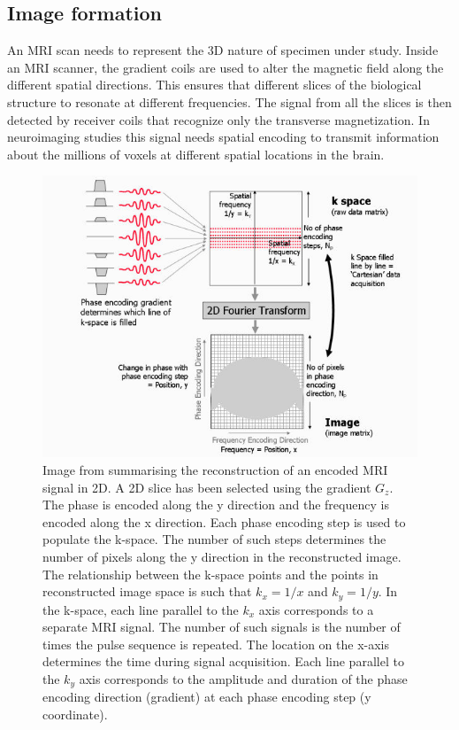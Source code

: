 \documentclass[msthesis.tex]{subfiles}
\begin{document}
\subsection{Image formation}

An \gls{MRI} scan needs to represent the 3D nature of specimen under study. Inside an \gls{MRI} scanner, the gradient coils are used to alter the magnetic field along the different spatial directions. This ensures that different slices of the biological structure to resonate at different frequencies. The signal from all the slices is then detected by receiver coils that recognize only the transverse magnetization. In neuroimaging studies this signal needs spatial encoding to transmit information about the millions of voxels at different spatial locations in the brain.

\begin{figure}
    \centering
    \includegraphics[width=\textwidth]{images/img_reconstruction.jpg}
    \caption{Image from \cite{MRIrecon} summarising the reconstruction of an encoded \gls{MRI} signal in 2D. A  2D slice has been selected using the gradient $G_z$. The phase is encoded along the y direction and the frequency is encoded along the x direction. Each phase encoding step is used to populate the k-space. The number of such steps determines the number of pixels along the y direction in the reconstructed image. The relationship between the k-space points and the points in reconstructed image space is such that $k_x =1/x$ and $k_y= 1/y$. In the k-space, each line parallel to the $k_x$ axis corresponds to a separate MRI signal. The number of such signals is the number of times the pulse sequence is repeated. The location on the x-axis determines the time during signal acquisition. Each line parallel to the $k_y$ axis corresponds to the amplitude and duration of the phase encoding direction (gradient) at each phase encoding step (y coordinate).}
    \label{fig:mri_img}
\end{figure}
\end{document}

